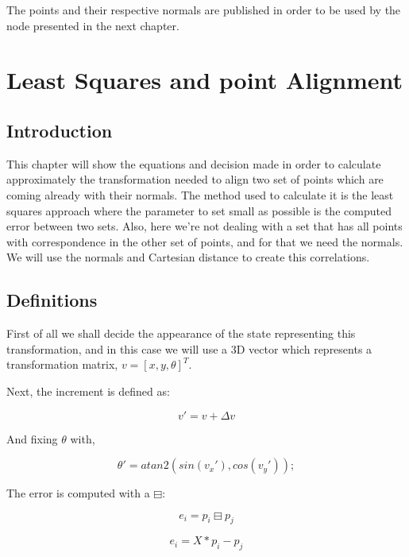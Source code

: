 \documentclass[10pt,a4paper,final]{report}
\begin{document}
The points and their respective normals are published in order to be used by the node presented in the next chapter.

\chapter{Least Squares and point Alignment}

\section{Introduction}

This chapter will show the equations and decision made in order to calculate approximately the transformation needed to align two set of points which are coming already with their normals.
The method used to calculate it is the least squares approach where the parameter to set small as possible is the computed error between two sets. Also, here we're not dealing with a set that has all points with correspondence in the other set of points, and for that we need the normals. We will use the normals and Cartesian distance to create this correlations.

\section{Definitions}

First of all we shall decide the appearance of the state representing this transformation, and in this case we will use a 3D vector which represents a transformation matrix, \textbf{$v = [x, y, \theta]^T$}.

Next, the increment is defined as:

\begin{equation}
v' = v + \Delta v
\end{equation}

And fixing $\theta$ with, 

\begin{equation}
\theta ' = atan2(sin(v_{x}'), cos(v_{y}'));
\end{equation}


The error is computed with a $\boxminus$:

\begin{equation}
\textit{e}_{i} = p_{i} \boxminus p_{j}
\end{equation}

\begin{equation}
\textit{e}_{i} = X*p_{i} - p_{j}
\end{equation}
\end{document}
